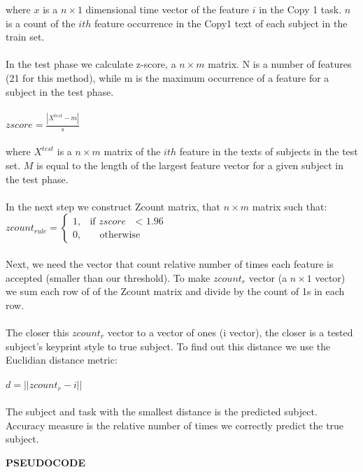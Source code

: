 \documentclass[12pt,a4]{article}
\begin{document}
where $x$ is a $n\times 1$ dimensional time vector of the feature $i$ in the Copy 1 task. $n$ is a count of the $ith$ feature occurrence in the Copy1 text of each subject in the train set.\\
\\
In the test phase we calculate z-score, a $n \times m$ matrix. N is a number of features (21 for this method), while m is the maximum occurrence of a feature for a subject in the test phase.\\
\\
$
zscore = \frac{|X^{test} - m|}{s}
$ \\
\\
where $X^{test}$ is a $n\times m$ matrix of the $ith$ feature in the texts of subjects in the test set. $M$ is equal to the length of the largest feature vector for a given subject in the test phase. \\
\\
In the next step we construct Zcount matrix, that $n \times m$ matrix such that:
\\
$
zcount_{rule} = \begin{cases} 1, & \mbox{if } zscore \mbox{ $<$ 1.96} \\ 0, & \mbox{ } \mbox{ otherwise} \end{cases}
$\\
\\
Next, we need the vector that count relative number of times each feature is accepted (smaller than our threshold). To make $zcount_r$ vector (a $n \times 1$ vector) we sum each row of of the Zcount matrix and divide by the count of 1s in each row. \\
\\
The closer this $zcount_r$ vector to a vector of ones (i vector), the closer is a tested subject's keyprint style to true subject. To find out this distance we use the Euclidian distance metric: \\
\\
$
d = ||zcount_r - i||
$\\
\\
The subject and task with the smallest distance is the predicted subject. Accuracy measure is the relative number of times we correctly predict the true subject.


\small\textbf{PSEUDOCODE}

\normalsize
\end{document}
